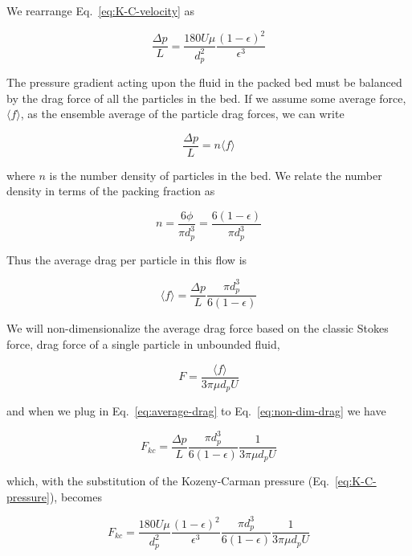 We rearrange Eq.~\ref{eq:K-C-velocity} as

\begin{equation}\label{eq:K-C-pressure}
	\frac{\Delta p}{L} = \frac{180 U \mu}{d_p^2} \frac{(1-\epsilon)^2}{\epsilon^3}
\end{equation}

The pressure gradient acting upon the fluid in the packed bed must be balanced by the drag force of all the particles in the bed. If we assume some average force, $\langle f \rangle$, as the ensemble average of the particle drag forces, we can write

\begin{equation}
	\frac{\Delta p}{L} = n \langle f \rangle
\end{equation}

where $n$ is the number density of particles in the bed. We relate the number density in terms of the packing fraction as

\begin{equation}
	n = \frac{6\phi}{\pi d_p^3} = \frac{6(1-\epsilon)}{\pi d_p^3}
\end{equation}

Thus the average drag per particle in this flow is

\begin{equation}\label{eq:average-drag}
	\langle f \rangle = \frac{\Delta p}{L}\frac{\pi d_p^3}{6(1-\epsilon)}
\end{equation}

We will non-dimensionalize the average drag force based on the classic Stokes force, drag force of a single particle in unbounded fluid,

\begin{equation}\label{eq:non-dim-drag}
	F = \frac{\langle f \rangle}{3\pi \mu d_p U}
\end{equation}

and when we plug in Eq.~\ref{eq:average-drag} to Eq.~\ref{eq:non-dim-drag} we have

\begin{equation}
	F_{kc} = \frac{\Delta p}{L}\frac{\pi d_p^3}{6(1-\epsilon)}\frac{1}{3\pi \mu d_p U}
\end{equation}

which, with the substitution of the Kozeny-Carman pressure (Eq.~\ref{eq:K-C-pressure}), becomes

\begin{equation}
	F_{kc} = \frac{180 U \mu}{d_p^2} \frac{(1-\epsilon)^2}{\epsilon^3}\frac{\pi d_p^3}{6(1-\epsilon)}\frac{1}{3\pi \mu d_p U}
\end{equation}

